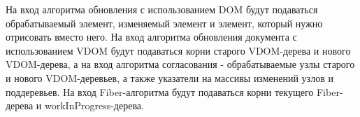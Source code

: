 На вход алгоритма обновления с использованием DOM будут подаваться обрабатываемый элемент, изменяемый элемент и элемент, который нужно отрисовать вместо него.
На вход алгоритма обновления документа с использованием VDOM будут подаваться корни старого VDOM-дерева и нового VDOM-дерева, а на вход алгоритма согласования - обрабатываемые узлы старого и нового VDOM-деревьев, а также указатели на массивы изменений узлов и поддеревьев.
На вход Fiber-алгоритма будут подаваться корни текущего Fiber-дерева и workInProgress-дерева.